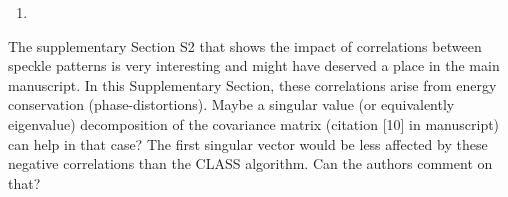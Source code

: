 \documentclass[12pt]{article}
\newenvironment{solved_reviewercomment}
    {\begin{tcolorbox}[width=\linewidth,colback=gray!5,colframe=solved_commentcolor!50,title=Reviewer Comment,left=5pt,right=5pt]}
    {\end{tcolorbox}}
\begin{document}
\begin{enumerate}[label=\arabic*., resume]
\item \leavevmode
\end{enumerate}
\vspace{-1em}
\begin{solved_reviewercomment}
    The supplementary Section S2 that shows the impact of correlations between speckle patterns is very interesting and might have deserved a place in the main manuscript. In this Supplementary Section, these correlations arise from energy conservation (phase-distortions). Maybe a singular value (or equivalently eigenvalue) decomposition of the covariance matrix \cite{badon2020distortion}(citation [10] in manuscript) can help in that case? The first singular vector would be less affected by these negative correlations than the CLASS algorithm. Can the authors comment on that? 
\end{solved_reviewercomment}
\end{document}
